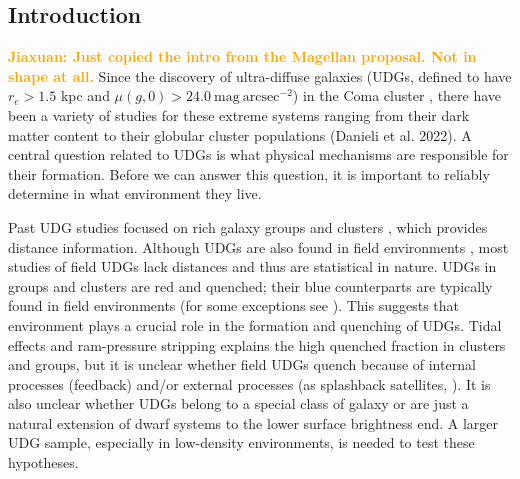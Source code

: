 \documentclass[twocolumn,astrosymb,twocolappendix]{aastex631}
\newcommand{\jiaxuan}[1]{\textcolor{orange}{\textbf{Jiaxuan: #1}}}
\begin{document}
\begin{CJK*}{UTF8}{gbsn}

\begin{abstract}

\end{abstract}



\section{Introduction} \label{sec:intro}

\jiaxuan{Just copied the intro from the Magellan proposal. Not in shape at all.}
Since the discovery of ultra-diffuse galaxies (UDGs, defined to have $r_e > 1.5$ kpc and $\mu(g,0)>24.0\ \mathrm{mag\ arcsec^{-2}}$) in the Coma cluster \citep{vanDokkum2015}, there have been a variety of studies for these extreme systems ranging from their dark matter content \citep{vanDokkum2018,vanDokkum2019} to their globular cluster populations (Danieli et al. 2022). A central question related to UDGs is what physical mechanisms are responsible for their formation. Before we can answer this question, it is important to reliably determine in what environment they live.

Past UDG studies focused on rich galaxy groups and clusters \citep[e.g.,][]{Yagi2016,Zaritsky2019}, which provides distance information. Although UDGs are also found in field environments \citep{Prole2019,Tanoglidis2021,Kadowaki2021}, most studies of field UDGs lack distances and thus are statistical in nature. UDGs in groups and clusters are red and quenched; their blue counterparts are typically found in field environments (for some exceptions see \citealt{Roman2019,Prole2019}). This suggests that environment plays a crucial role in the formation and quenching of UDGs. Tidal effects and ram-pressure stripping explains the high quenched fraction in clusters and groups, but it is unclear whether field UDGs quench because of internal processes (feedback) and/or external processes (as splashback satellites, \citealt{Benavides2021}). It is also unclear whether UDGs belong to a special class of galaxy or are just a natural extension of dwarf systems to the lower surface brightness end. A larger UDG sample, especially in low-density environments, is needed to test these hypotheses.



\end{CJK*}
\end{document}
